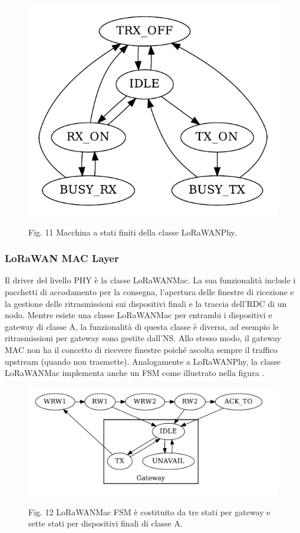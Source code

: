 \documentclass[a4paper]{report} %
\begin{document}
\begin{figure}
\centering
\includegraphics[scale=.5]{Immagini/MSFLoRaWAN.png}

Fig. 11 Macchina a stati finiti della classe LoRaWANPhy.
\end{figure}

\subsubsection{LoRaWAN MAC Layer} 
Il driver del livello PHY è la classe LoRaWANMac. La sua funzionalità include i pacchetti di accodamento per la consegna, l'apertura delle finestre di ricezione e la gestione delle ritrasmissioni sui dispositivi finali e la traccia dell'RDC di un nodo. Mentre esiste una classe LoRaWANMac per entrambi i dispositivi e gateway di classe A, la funzionalità di questa classe è diversa, ad esempio le ritrasmissioni per gateway sono gestite dall'NS. Allo stesso modo, il gateway MAC non ha il concetto di ricevere finestre poiché ascolta sempre il traffico upstream (quando non trasmette). Analogamente a LoRaWANPhy, la classe LoRaWANMac implementa anche un FSM come illustrato nella figura \cite{art:rif.49}. 

\begin{figure}
\centering
\includegraphics[scale=.3]{Immagini/MSFLoRaMAC.png}

Fig. 12 LoRaWANMac FSM è costituito da tre stati per gateway e sette stati per dispositivi finali di classe A.
\end{figure}
\end{document}
